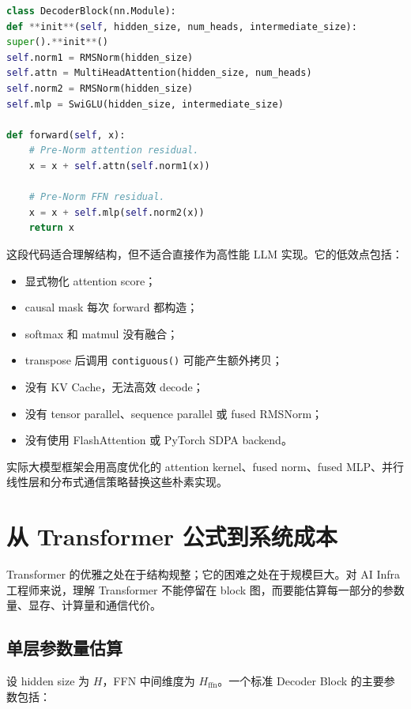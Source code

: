 \begin{lstlisting}[language=Python,caption={教学版 Transformer Decoder Block},label={lst:decoder-block-pytorch}]
class DecoderBlock(nn.Module):
def **init**(self, hidden_size, num_heads, intermediate_size):
super().**init**()
self.norm1 = RMSNorm(hidden_size)
self.attn = MultiHeadAttention(hidden_size, num_heads)
self.norm2 = RMSNorm(hidden_size)
self.mlp = SwiGLU(hidden_size, intermediate_size)

def forward(self, x):
    # Pre-Norm attention residual.
    x = x + self.attn(self.norm1(x))

    # Pre-Norm FFN residual.
    x = x + self.mlp(self.norm2(x))
    return x

\end{lstlisting}

这段代码适合理解结构，但不适合直接作为高性能 LLM 实现。它的低效点包括：

\begin{itemize}
\item 显式物化 attention score；
\item causal mask 每次 forward 都构造；
\item softmax 和 matmul 没有融合；
\item transpose 后调用 \texttt{contiguous()} 可能产生额外拷贝；
\item 没有 KV Cache，无法高效 decode；
\item 没有 tensor parallel、sequence parallel 或 fused RMSNorm；
\item 没有使用 FlashAttention 或 PyTorch SDPA backend。
\end{itemize}

实际大模型框架会用高度优化的 attention kernel、fused norm、fused MLP、并行线性层和分布式通信策略替换这些朴素实现。

\section{从 Transformer 公式到系统成本}
\label{sec:transformer-formula-to-system-cost}

Transformer 的优雅之处在于结构规整；它的困难之处在于规模巨大。对 AI Infra 工程师来说，理解 Transformer 不能停留在 block 图，而要能估算每一部分的参数量、显存、计算量和通信代价。

\subsection{单层参数量估算}
\label{subsec:transformer-layer-parameter-estimation}

设 hidden size 为 $H$，FFN 中间维度为 $H_{\mathrm{ffn}}$。一个标准 Decoder Block 的主要参数包括：

